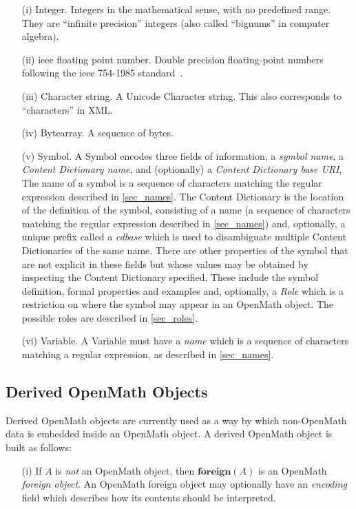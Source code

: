 \documentclass{report}
\def\textquote#1{``#1''}
\def\OM{OpenMath\xspace}
\def\XML{XML\xspace}
\def\acronym#1{\textsf{#1}}
\def\foreign#1{\mathbf{foreign}(#1)}
\begin{document}
\begin{itemize}
\item[(i)] Integer.  Integers in the mathematical sense, with no predefined range.  They
  are \textquote{infinite precision} integers (also called \textquote{bignums} in computer
  algebra).
\item[(ii)] \acronym{ieee} floating point number.  Double precision floating-point numbers
  following the \acronym{ieee} 754-1985 standard~\cite{ieee754_85}.
\item[(iii)] Character string.  A Unicode Character string. This also corresponds to
  \textquote{characters} in \XML.
\item[(iv)] Bytearray.  A sequence of bytes.
\item[(v)] Symbol.  A Symbol encodes three fields of information, a \emph{symbol name}, a
  \emph{Content Dictionary name}, and (optionally) a \emph{Content Dictionary base URI},
  The name of a symbol is a sequence of characters matching the regular expression
  described in \ref{sec_names}.  The Content Dictionary is the location of the definition
  of the symbol, consisting of a name (a sequence of characters matching the regular
  expression described in \ref{sec_names}) and, optionally, a unique prefix called a
  \emph{cdbase} which is used to disambiguate multiple Content Dictionaries of the same
  name.  There are other properties of the symbol that are not explicit in these fields
  but whose values may be obtained by inspecting the Content Dictionary specified. These
  include the symbol definition, formal properties and examples and, optionally, a
  \emph{Role} which is a restriction on where the symbol may appear in an \OM object.  The
  possible roles are described in \ref{sec_roles}.
\item[(vi)] Variable.  A Variable must have a \emph{name} which is a sequence of
  characters matching a regular expression, as described in \ref{sec_names}.
\end{itemize}


\subsection{Derived \OM Objects}\label{sec_derived}

Derived \OM objects are currently used as a way by which non-\OM
data is embedded inside an \OM object.
A derived \OM object is built as follows: 
\begin{itemize}
\item[(i)] If $A$ is \emph{not} an \OM object, then $\foreign{A}$ is an \OM
  \emph{foreign object}.  An \OM foreign object may optionally have an \emph{encoding}
  field which describes how its contents should be interpreted.
\end{itemize}
\end{document}
